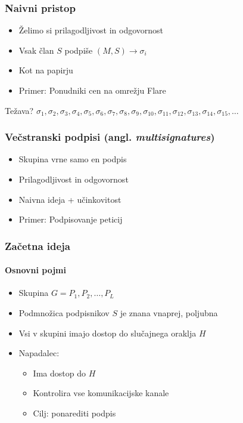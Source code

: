 \documentclass{beamer}    %
\begin{document}
\begin{frame}
    \frametitle{Naivni pristop}
    \begin{itemize}
        \item Želimo si prilagodljivost in odgovornost
        \item Vsak član $S$ podpiše $(M, S) \rightarrow \sigma_i$
        \item Kot na papirju
        \item Primer: Ponudniki cen na omrežju Flare 
    \end{itemize}
    \vspace{1cm}
    Težava?
        $\sigma_1, \sigma_2, \sigma_3, \sigma_4, \sigma_5, \sigma_6,
        \sigma_7,  \sigma_8, \sigma_9, \sigma_{10}, \sigma_{11}, \sigma_{12}, 
        \sigma_{13}, \sigma_{14}, \sigma_{15}, \dots$
\end{frame}

\begin{frame}
    \frametitle{Večstranski podpisi (angl. \textit{multisignatures})}
    \begin{itemize}
        \item Skupina vrne samo en podpis
        \item Prilagodljivost in odgovornost
        \item Naivna ideja + učinkovitost
        \item Primer: Podpisovanje peticij
    \end{itemize}
\end{frame}

\begin{frame}
    \frametitle{Začetna ideja}
    \framesubtitle{Osnovni pojmi}
    \begin{itemize}
        \item Skupina $G = P_1, P_2, \dots, P_L$
        \item Podmnožica podpisnikov $S$ je znana vnaprej, poljubna
        \item Vsi v skupini imajo dostop do slučajnega oraklja $H$
        \item Napadalec: 
            \begin{itemize}
                \item Ima dostop do $H$
                \item Kontrolira vse komunikacijske kanale
                \item Cilj: ponarediti podpis
            \end{itemize}
    \end{itemize}
\end{frame}
\end{document}
